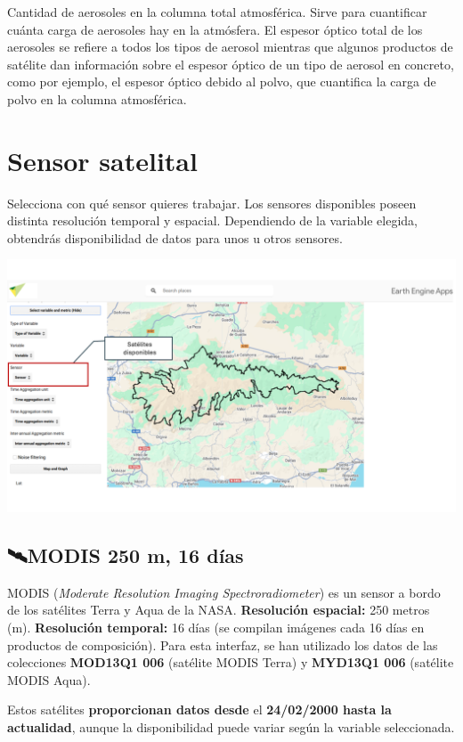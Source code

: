 \documentclass[
]{book}
\begin{document}
Cantidad de aerosoles en la columna total atmosférica. Sirve para cuantificar cuánta carga de aerosoles hay en la atmósfera. El espesor óptico total de los aerosoles se refiere a todos los tipos de aerosol mientras que algunos productos de satélite dan información sobre el espesor óptico de un tipo de aerosol en concreto, como por ejemplo, el espesor óptico debido al polvo, que cuantifica la carga de polvo en la columna atmosférica.

\chapter{Sensor satelital}\label{sensor}

Selecciona con qué sensor quieres trabajar. Los sensores disponibles poseen distinta resolución temporal y espacial. Dependiendo de la variable elegida, obtendrás disponibilidad de datos para unos u otros sensores.

\includegraphics{assets/sensor_es.png}

\section{\texorpdfstring{\textbf{🛰️MODIS 250 m, 16 días}}{🛰️MODIS 250 m, 16 días}}\label{modis-250-m-16-duxedas}

MODIS (\emph{Moderate Resolution Imaging Spectroradiometer}) es un sensor a bordo de los satélites Terra y Aqua de la NASA. \textbf{Resolución espacial:} 250 metros (m). \textbf{Resolución temporal:} 16 días (se compilan imágenes cada 16 días en productos de composición). Para esta interfaz, se han utilizado los datos de las colecciones \textbf{MOD13Q1 006} (satélite MODIS Terra) y \textbf{MYD13Q1 006} (satélite MODIS Aqua).

Estos satélites \textbf{proporcionan datos desde} el \textbf{24/02/2000 hasta la actualidad}, aunque la disponibilidad puede variar según la variable seleccionada.
\end{document}
